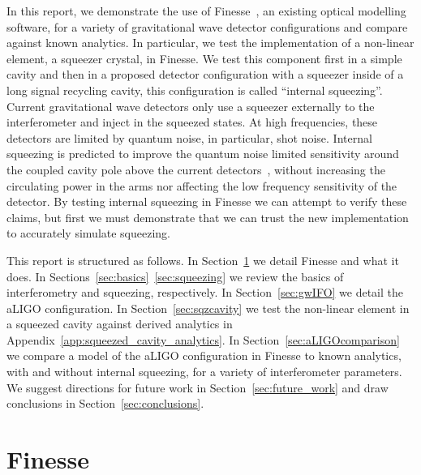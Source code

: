 \documentclass[aps,pra,superscriptaddress,reprint,nofootinbib]{revtex4-1}
\begin{document}
In this report, we demonstrate the use of Finesse~\cite{finesse}, an existing optical modelling software, for a variety of gravitational wave detector configurations and compare against known analytics. In particular, we test the implementation of a non-linear element, a squeezer crystal, in Finesse.
We test this component first in a simple cavity and then in a proposed detector configuration with a squeezer inside of a long signal recycling cavity, this configuration is called ``internal squeezing''.
Current gravitational wave detectors only use a squeezer externally to the interferometer and inject in the squeezed states.
At high frequencies, these detectors are limited by quantum noise, in particular, shot noise. Internal squeezing is predicted to improve the quantum noise limited sensitivity around the coupled cavity pole above the current detectors~\cite{Korobko_2019,Adya_2020}, without increasing the circulating power in the arms nor affecting the low frequency sensitivity of the detector.
By testing internal squeezing in Finesse we can attempt to verify these claims, but first we must demonstrate that we can trust the new implementation to accurately simulate squeezing.


This report is structured as follows.
In Section~\ref{sec:Finesse} we detail Finesse and what it does.
In Sections~\ref{sec:basics}~\ref{sec:squeezing} we review the basics of interferometry and squeezing, respectively. In Section~\ref{sec:gwIFO} we detail the aLIGO configuration.
In Section~\ref{sec:sqzcavity} we test the non-linear element in a squeezed cavity against derived analytics in Appendix~\ref{app:squeezed_cavity_analytics}. 
In Section~\ref{sec:aLIGOcomparison} we compare a model of the aLIGO configuration in Finesse to known analytics, with and without internal squeezing, for a variety of interferometer parameters.
We suggest directions for future work in Section~\ref{sec:future_work} and draw conclusions in Section~\ref{sec:conclusions}.


\section{Finesse} %
\label{sec:Finesse}
\end{document}
